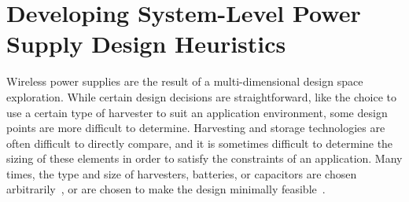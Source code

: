 \chapter{
Developing System-Level Power Supply Design Heuristics
}

\label{chap:intuition}

Wireless power supplies are the result of a multi-dimensional design space exploration.
While certain design decisions are straightforward, like the choice to use a certain type of harvester to suit an application environment, some design points are more difficult to determine. 
Harvesting and storage technologies are often difficult to directly compare, and it is sometimes difficult to determine the sizing of these elements in order to satisfy the constraints of an application. 
Many times, the type and size of harvesters, batteries, or capacitors are chosen arbitrarily~\cite{hamiltoniot,lee2013modular,juang2002energy}, or are chosen to make the design minimally feasible~\cite{yervaGrafting12,debruin2013monjolo,hesterFlicker17,afanasov2020battery}.


